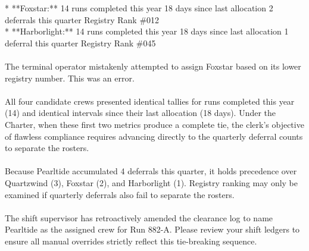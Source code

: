 \documentclass[9pt]{article}
\begin{document}
\begin{minipage}[t]{\textwidth}
\begin{minipage}[t]{0.49\textwidth}
\begin{exbox}
{  {}* **Foxstar:** 14 runs completed this year \textbar{} 18 days since last allocation \textbar{} 2 deferrals this quarter \textbar{} Registry Rank \#012 \\
  {}* **Harborlight:** 14 runs completed this year \textbar{} 18 days since last allocation \textbar{} 1 deferral this quarter \textbar{} Registry Rank \#045 \\
  \  \\
  The terminal operator mistakenly attempted to assign Foxstar based on its lower registry number. This was an error. \\
  \  \\
  All four candidate crews presented identical tallies for runs completed this year (14) and identical intervals since their last allocation (18 days). Under the Charter, when these first two metrics produce a complete tie, the clerk's objective of flawless compliance requires advancing directly to the quarterly deferral counts to separate the rosters. \\
  \  \\
  Because Pearltide accumulated 4 deferrals this quarter, it holds precedence over Quartzwind (3), Foxstar (2), and Harborlight (1). Registry ranking may only be examined if quarterly deferrals also fail to separate the rosters. \\
  \  \\
  The shift supervisor has retroactively amended the clearance log to name Pearltide as the assigned crew for Run 882-A. Please review your shift ledgers to ensure all manual overrides strictly reflect this tie-breaking sequence.}
\end{exbox}
\end{minipage}
\end{minipage}
\clearpage
\end{document}
